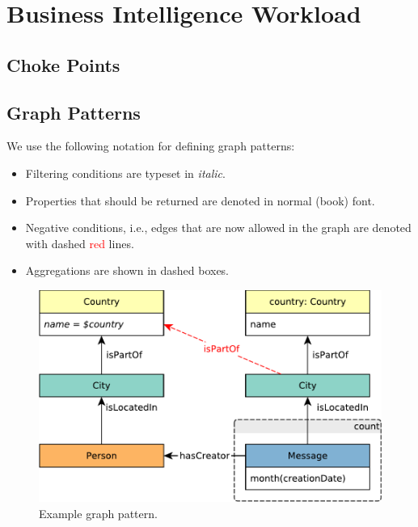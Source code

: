 \chapter{Business Intelligence Workload}

\section{Choke Points}


\section{Graph Patterns}

We use the following notation for defining graph patterns:

\begin{itemize}
	\item Filtering conditions are typeset in \textit{italic}.
	\item Properties that should be returned are denoted in normal (book) font.
	\item Negative conditions, i.e., edges that are now allowed in the graph are denoted with dashed \textcolor{red}{red} lines.
	\item Aggregations are shown in dashed boxes.
\end{itemize}

\begin{figure}[hbp]
	\begin{center}
		\includegraphics[scale=\patternscale,margin=0cm .2cm]{patterns/q23}
		\caption{Example graph pattern.}
		\label{fig:example-graph-pattern}
	\end{center}
\end{figure}



